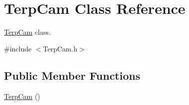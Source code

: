 \hypertarget{classTerpCam}{}\section{Terp\+Cam Class Reference}
\label{classTerpCam}


\hyperlink{classTerpCam}{Terp\+Cam} class.  




{\ttfamily \#include $<$Terp\+Cam.\+h$>$}

\subsection*{Public Member Functions}
\begin{DoxyCompactItemize}
\item 
\hyperlink{classTerpCam_a447cd41ae2673fcb318f823c3624cf85}{Terp\+Cam} ()\hypertarget{classTerpCam_a447cd41ae2673fcb318f823c3624cf85}{}\label{classTerpCam_a447cd41ae2673fcb318f823c3624cf85}


\end{DoxyCompactItemize}
